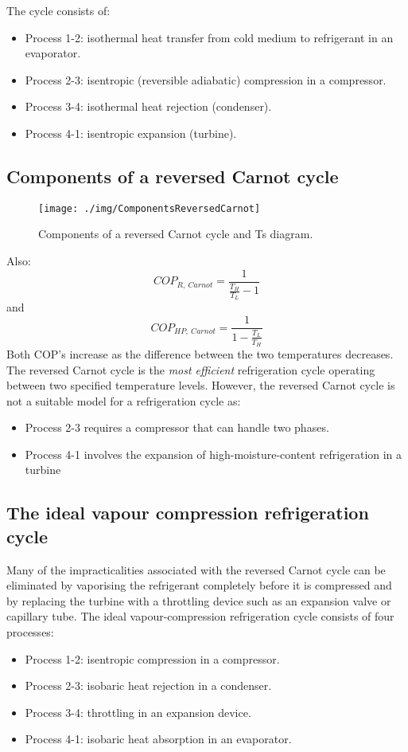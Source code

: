 The cycle consists of:
\begin{itemize}[noitemsep]
  \item Process 1-2: isothermal heat transfer from cold medium to refrigerant in an evaporator.
  \item Process 2-3: isentropic (reversible adiabatic) compression in a compressor.
  \item Process 3-4: isothermal heat rejection (condenser).
  \item Process 4-1: isentropic expansion (turbine).
\end{itemize}
\subsection{Components of a reversed Carnot cycle}
\begin{figure}
  \centering
  \texttt{[image: ./img/ComponentsReversedCarnot]}
  \caption{Components of a reversed Carnot cycle and Ts diagram.}
\end{figure}
Also:
\begin{equation}
  COP_{R, \ Carnot} = \frac{1}{\frac{T_H}{T_L} -1}
\end{equation}
and
\begin{equation}
  COP_{HP, \ Carnot} = \frac{1}{1 - \frac{T_L}{T_H}}
\end{equation}
Both COP's increase as the difference between the two temperatures decreases. The reversed Carnot cycle is the \emph{most efficient} refrigeration cycle operating between two specified temperature levels. However, the reversed Carnot cycle is not a suitable model for a refrigeration cycle as:
\begin{itemize}[noitemsep]
  \item Process 2-3 requires a compressor that can handle two phases.
  \item Process 4-1 involves the expansion of high-moisture-content refrigeration in a turbine
\end{itemize}
\subsection{The ideal vapour compression refrigeration cycle}
Many of the impracticalities associated with the reversed Carnot cycle can be eliminated by vaporising the refrigerant completely before it is compressed and by replacing the turbine with a throttling device such as an expansion valve or capillary tube. The ideal vapour-compression refrigeration cycle consists of four processes:
\begin{itemize}[noitemsep]
  \item Process 1-2: isentropic compression in a compressor.
  \item Process 2-3: isobaric heat rejection in a condenser.
  \item Process 3-4: throttling in an expansion device.
  \item Process 4-1: isobaric heat absorption in an evaporator.
\end{itemize}
